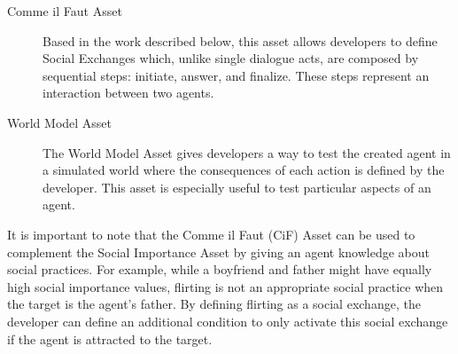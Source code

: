 \begin{description}
\item [Comme il Faut Asset] \hfill

Based in the work described below, this asset allows developers to define Social Exchanges which, unlike single dialogue acts, are composed by sequential steps: initiate, answer, and finalize.
These steps represent an interaction between two agents.

\item [World Model Asset] \hfill

The World Model Asset gives developers a way to test the created agent in a simulated world where the consequences of each action is defined by the developer.
This asset is especially useful to test particular aspects of an agent.

\end{description}

It is important to note that the Comme il Faut (CiF) Asset can be used to complement the Social Importance Asset by giving an agent knowledge about social practices.
For example, while a boyfriend and father might have equally high social importance values, flirting is not an appropriate social practice when the target is the agent's father.
By defining flirting as a social exchange, the developer can define an additional condition to only activate this social exchange if the agent is attracted to the target.





